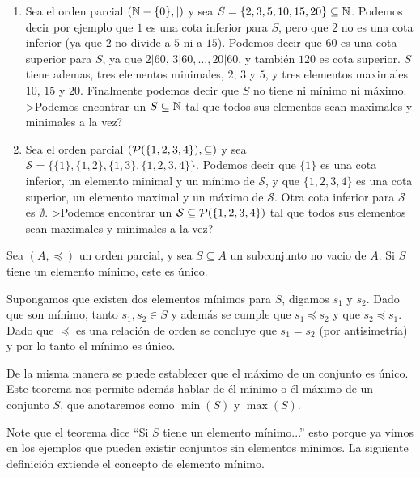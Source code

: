 \begin{ejemplo}
\begin{enumerate}
	\item
	Sea el orden parcial $(\N-\{0\},|)$ y sea $S=\{2,3,5,10,15,20\}\subseteq \N$.
	Podemos decir por ejemplo que $1$ es una cota inferior para $S$, pero que $2$ no es una cota inferior (ya que $2$ no divide a $5$ ni a $15$).
	Podemos decir que $60$ es una cota superior para $S$, ya que $2|60$, $3|60, \ldots, 20|60$, y también $120$ es cota superior.
	$S$ tiene ademas, tres elementos minimales, $2$, $3$ y $5$, y tres elementos maximales $10$, $15$ y $20$.
	Finalmente podemos decir que $S$ no tiene ni mínimo ni máximo.
	>Podemos encontrar un $S\subseteq \N$ tal que todos sus elementos sean maximales y minimales a la vez?
	
	\item 
	Sea el orden parcial $(\P(\{1,2,3,4\}),\subseteq)$ y sea $\mathcal S=\{\{1\},\{1,2\},\{1,3\},\{1,2,3,4\}\}$.
	Podemos decir que $\{1\}$ es una cota inferior, un elemento minimal y un mínimo de $\mathcal S$, y que $\{1,2,3,4\}$ es una cota superior, un elemento maximal y un máximo de $\mathcal S$.
	Otra cota inferior para $\mathcal S$ es $\emptyset$.
	>Podemos encontrar un $\mathcal S\subseteq\P(\{1,2,3,4\})$ tal que todos sus elementos sean maximales y minimales a la vez?
	\end{enumerate}
\end{ejemplo}

\begin{teorema}
Sea $(A,\preceq)$ un orden parcial, y sea $S\subseteq A$ un subconjunto no vacio de $A$.
Si $S$ tiene un elemento mínimo, este es único.

\begin{demostracion}
Supongamos que existen dos elementos mínimos para $S$, digamos $s_1$ y $s_2$.
Dado que son mínimo, tanto $s_1,s_2\in S$ y además se cumple que $s_1\preceq s_2$ y que $s_2\preceq s_1$.
Dado que $\preceq$ es una relación de orden se concluye que $s_1=s_2$ (por antisimetría) y por lo tanto el mínimo es único.
\end{demostracion}

De la misma manera se puede establecer que el máximo de un conjunto es único.
Este teorema nos permite además hablar de él mínimo o él máximo de un conjunto $S$, que anotaremos como $\min(S)$ y $\max(S)$.
\end{teorema}

Note que el teorema dice ``Si $S$ tiene un elemento mínimo...'' esto porque ya vimos en los ejemplos que pueden existir conjuntos sin elementos mínimos.
La siguiente definición extiende el concepto de elemento mínimo.

